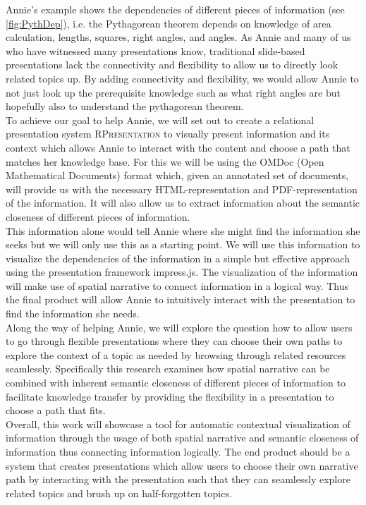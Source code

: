 \documentclass[twoside, 12pt]{article}
\newcommand{\sys}{\textsc{RPresentation}\xspace}
\begin{document}
Annie's example shows the dependencies of different pieces of information (see \autoref{fig:PythDep}), i.e. the Pythagorean theorem depends on knowledge of area calculation, lengths, squares, right angles, and angles. As Annie and many of us who have witnessed many presentations know, traditional slide-based presentations lack the connectivity and flexibility to allow us to directly look related topics up. By adding connectivity and flexibility, we would allow Annie to not just look up the prerequisite knowledge such as what right angles are but hopefully also to understand the pythagorean theorem.\\

To achieve our goal to help Annie, we will set out to create a relational presentation system \sys to visually present information and its context which allows Annie to interact with the content and choose a path that matches her knowledge base. For this we will be using the OMDoc (Open Mathematical Documents) format which, given an annotated set of documents, will provide us with the necessary HTML-representation and PDF-representation of the information. It will also allow us to extract information about the semantic closeness of different pieces of information.\\

This information alone would tell Annie where she might find the information she seeks but we will only use this as a starting point. We will use this information to visualize the dependencies of the information in a simple but effective approach using the presentation framework impress.js. The visualization of the information will make use of spatial narrative to connect information in a logical way. Thus the final product will allow Annie to intuitively interact with the presentation to find the information she needs.\\

Along the way of helping Annie, we will explore the question how to allow users to go through flexible presentations where they can choose their own paths to explore the context of a topic as needed by browsing through related resources seamlessly. Specifically this research examines how spatial narrative can be combined with inherent semantic closeness of different pieces of information to facilitate knowledge transfer by providing the flexibility in a presentation to choose a path that fits.\\

Overall, this work will showcase a tool for automatic contextual visualization of information through the usage of both spatial narrative and semantic closeness of information thus connecting information logically. The end product should be a system that creates presentations which allow users to choose their own narrative path by interacting with the presentation such that they can seamlessly explore related topics and brush up on half-forgotten topics.\\
\end{document}
